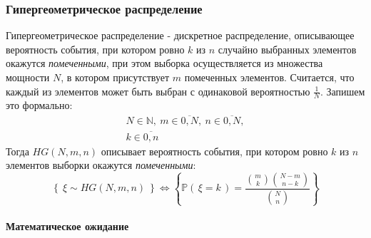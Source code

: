 \documentclass[
  russian,
  a4paper,
]{article}
\let\oldparagraph\paragraph
\renewcommand{\paragraph}[1]{\oldparagraph{#1}\mbox{}}
\begin{document}
\hypertarget{ux433ux438ux43fux435ux440ux433ux435ux43eux43cux435ux442ux440ux438ux447ux435ux441ux43aux43eux435-ux440ux430ux441ux43fux440ux435ux434ux435ux43bux435ux43dux438ux435}{%
\subsubsection{Гипергеометрическое
распределение}\label{ux433ux438ux43fux435ux440ux433ux435ux43eux43cux435ux442ux440ux438ux447ux435ux441ux43aux43eux435-ux440ux430ux441ux43fux440ux435ux434ux435ux43bux435ux43dux438ux435}}

Гипергеометрическое распределение - дискретное распределение,
описывающее вероятность события, при котором ровно \(k\) из \(n\)
случайно выбранных элементов окажутся \emph{помеченными}, при этом
выборка осуществляется из множества мощности \(N\), в котором
присутствует \(m\) помеченных элементов. Считается, что каждый из
элементов может быть выбран с одинаковой вероятностью \(\frac{1}{N}\).
Запишем это формально: \[\begin{gathered}
    N \in \mathbb{N},\ m \in \overline{0, N},\ n \in \overline{0, N},\\
    k \in \overline{0, n}
\end{gathered}\] Тогда \(HG(N, m, n)\) описывает вероятность события,
при котором ровно \(k\) из \(n\) элементов выборки окажутся
\emph{помеченными}:
\begin{equation}\left\{\ \xi \sim HG(N, m, n)\ \right\}
\iff
\left\{\mathbb{P}\left(\, \xi=k \,\right) = \frac{\binom{m}{k}\binom{N-m}{n-k}}{\binom{N}{n}}\right\}\label{eq:hg_def}\end{equation}

\hypertarget{ux43cux430ux442ux435ux43cux430ux442ux438ux447ux435ux441ux43aux43eux435-ux43eux436ux438ux434ux430ux43dux438ux435}{%
\paragraph{Математическое
ожидание}\label{ux43cux430ux442ux435ux43cux430ux442ux438ux447ux435ux441ux43aux43eux435-ux43eux436ux438ux434ux430ux43dux438ux435}}
\end{document}
